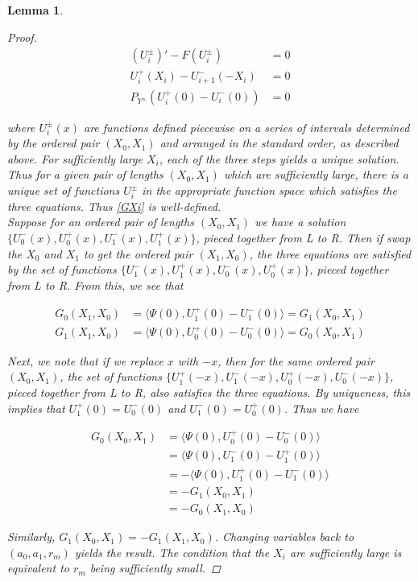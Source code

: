 \documentclass[12pt]{article}
\newtheorem{lemma}{Lemma}
\begin{document}
\begin{lemma}
\begin{proof}
\begin{align*}
(U_i^\pm)' - F(U_i^\pm) &= 0 \\
U_i^+(X_i) - U_{i+1}^-(-X_i) &= 0 \\
P_{Y^\pm}(U_i^+(0) - U_i^-(0)) &= 0
\end{align*}

where $U_i^\pm(x)$ are functions defined piecewise on a series of intervals determined by the ordered pair $(X_0, X_1)$ and arranged in the standard order, as described above. For sufficiently large $X_i$, each of the three steps yields a unique solution. Thus for a given pair of lengths $(X_0, X_1)$ which are sufficiently large, there is a unique set of functions $U_i^\pm$ in the appropriate function space which satisfies the three equations. Thus \eqref{GXi} is well-defined.
\\

Suppose for an ordered pair of lengths $(X_0, X_1)$ we have a solution $\{ U_0^-(x), U_0^+(x), U_1^-(x), U_1^+(x) \}$, pieced together from L to R. Then if swap the $X_0$ and $X_1$ to get the ordered pair $(X_1, X_0)$, the three equations are satisfied by the set of functions $\{ U_1^-(x), U_1^+(x), U_0^-(x), U_0^+(x)\}$, pieced together from L to R. From this, we see that

\begin{align*}
G_0(X_1, X_0) &= \langle \Psi(0), U_1^+(0) - U_1^-(0) \rangle = G_1(X_0, X_1) \\
G_1(X_1, X_0) &= \langle \Psi(0), U_0^+(0) - U_0^-(0) \rangle = G_0(X_0, X_1)
\end{align*}

Next, we note that if we replace $x$ with $-x$, then for the same ordered pair $(X_0, X_1)$, the set of functions $\{ U_1^+(-x), U_1^-(-x), U_0^+(-x), U_0^-(-x)\}$, pieced together from L to R, also satisfies the three equations. By uniqueness, this implies that $U_1^+(0) = U_0^-(0)$ and $U_1^-(0) = U_0^+(0)$. Thus we have

\begin{align*}
G_0(X_0, X_1) &= \langle \Psi(0), U_0^+(0) - U_0^-(0) \rangle \\
&= \langle \Psi(0), U_1^-(0) - U_1^+(0) \rangle \\
&= -\langle \Psi(0), U_1^+(0) - U_1^-(0) \rangle \\
&= -G_1(X_0, X_1) \\
&= -G_0(X_1, X_0)
\end{align*}

Similarly, $G_1(X_0, X_1) = -G_1(X_1, X_0)$. Changing variables back to $(a_0, a_1, r_m)$ yields the result. The condition that the $X_i$ are sufficiently large is equivalent to $r_m$ being sufficiently small.

\end{proof}
\end{lemma}
\end{document}
